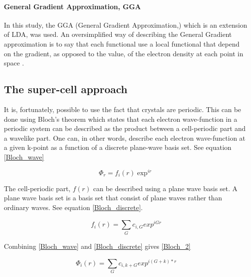 \documentclass[12pt,a4paper]{article}
\begin{document}
\paragraph{General Gradient Approximation, GGA}
In this study, the GGA (General Gradient Approximation,) which is an extension of LDA, was used. An oversimplified way of describing the General Gradient approximation is to say that each functional use a local functional that depend on the gradient, as opposed to the value, of the electron density at each point in space \cite{burke}.


\subsection{The super-cell approach}
It is, fortunately, possible to use the fact that crystals are periodic. This can be done using Bloch's theorem which states that each electron wave-function in a periodic system can be described as the product between a cell-periodic part and a wavelike part. One can, in other words, describe each electron wave-function at a given k-point as a function of a discrete plane-wave basis set. See equation \ref{Bloch_wave}

\begin{equation}\label{Bloch_wave} \tag{Bloch's theorem 1} 
\Phi_r=f_i(r)\exp^{ir}
\end{equation}

The cell-periodic part, $f(r)$ can be described using a plane wave basis set. A plane wave basis set is a basis set that consist of plane waves rather than ordinary waves. See equation \ref{Bloch_discrete}.

\begin{equation}\label{Bloch_discrete} \tag{Bloch's theorem (discrete part 1} 
f_i(r)=\sum\limits_{G}^{} c_{i, G} exp^{iGr}
\end{equation}

Combining \ref{Bloch_wave} and \ref{Bloch_discrete} gives \ref{Bloch_2}

\begin{equation}\label{Bloch_2} \tag{Bloch's theorem 2} 
\Phi_i(r)=\sum\limits_{G}^{} c_{i,k + G} exp^{i(G+k)*r}
\end{equation}
\end{document}

